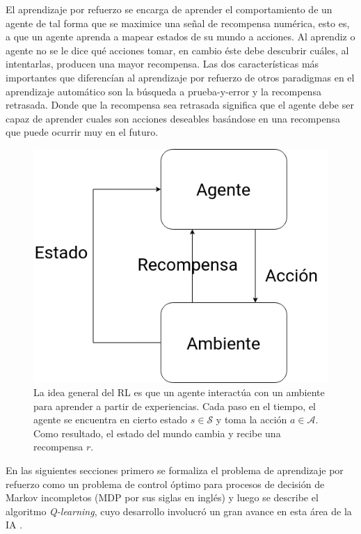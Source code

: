 El aprendizaje por refuerzo se encarga de aprender el comportamiento de un agente 
de tal forma que se maximice una señal de recompensa numérica, esto es, a que un
agente aprenda a mapear estados de su mundo a acciones. Al aprendiz o agente no se le 
dice qué acciones tomar, en cambio éste debe descubrir cuáles, al intentarlas, producen
una mayor recompensa. Las dos características más importantes que diferencían al
aprendizaje por refuerzo de otros paradigmas en el aprendizaje automático son 
la búsqueda a prueba-y-error y la recompensa retrasada. Donde que la recompensa sea retrasada significa que el agente debe ser 
capaz de aprender cuales son acciones deseables basándose en una recompensa que puede ocurrir muy en el futuro.

\begin{figure}[h]
    \centering
    \includegraphics[scale=0.3]{Chapter2/Figs/agend_interaction.png}
    \caption{La idea general del RL es que un agente interactúa con un ambiente para
    aprender a partir de experiencias. Cada paso en el tiempo, el agente se encuentra
    en cierto estado $s\in \mathcal{S}$ y toma la acción $a \in \mathcal{A}$. Como
    resultado, el estado del mundo cambia y recibe una recompensa $r$.}
\end{figure}

En las siguientes secciones primero se formaliza el problema de aprendizaje por refuerzo como
un problema de control óptimo para procesos de decisión de Markov incompletos (MDP por sus siglas en inglés) y luego se
describe el algoritmo \textit{Q-learning}, cuyo desarrollo involucró un gran avance en esta área de la IA  .

